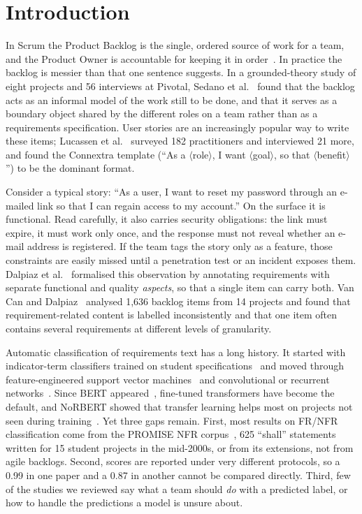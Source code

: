 \documentclass[conference,10pt,letterpaper]{IEEEtran}
\begin{document}
\section{Introduction}\label{sec:intro}
In Scrum the Product Backlog is the single, ordered source of work for a team, and the Product Owner is accountable for keeping it in order~\cite{scrumguide2020}. In practice the backlog is messier than that one sentence suggests. In a grounded-theory study of eight projects and 56 interviews at Pivotal, Sedano et al.~\cite{sedano2019} found that the backlog acts as an informal model of the work still to be done, and that it serves as a boundary object shared by the different roles on a team rather than as a requirements specification. User stories are an increasingly popular way to write these items; Lucassen et al.~\cite{lucassen2016use} surveyed 182 practitioners and interviewed 21 more, and found the Connextra template (“As a $\langle$role$\rangle$, I want $\langle$goal$\rangle$, so that $\langle$benefit$\rangle$”) to be the dominant format.

Consider a typical story: “As a user, I want to reset my password through an e-mailed link so that I can regain access to my account.” On the surface it is functional. Read carefully, it also carries security obligations: the link must expire, it must work only once, and the response must not reveal whether an e-mail address is registered. If the team tags the story only as a feature, those constraints are easily missed until a penetration test or an incident exposes them. Dalpiaz et al.~\cite{dalpiaz2019} formalised this observation by annotating requirements with separate functional and quality \emph{aspects}, so that a single item can carry both. Van Can and Dalpiaz~\cite{vancan2025} analysed 1,636 backlog items from 14 projects and found that requirement-related content is labelled inconsistently and that one item often contains several requirements at different levels of granularity.

Automatic classification of requirements text has a long history. It started with indicator-term classifiers trained on student specifications~\cite{clelandhuang2007} and moved through feature-engineered support vector machines~\cite{kurtanovic2017,diascanedo2020} and convolutional or recurrent networks~\cite{rahman2019,rahimi2021}. Since BERT appeared~\cite{devlin2019}, fine-tuned transformers have become the default, and NoRBERT showed that transfer learning helps most on projects not seen during training~\cite{hey2020norbert,hey2022corrected}. Yet three gaps remain. First, most results on FR/NFR classification come from the PROMISE NFR corpus~\cite{promisenfr2007}, 625 “shall” statements written for 15 student projects in the mid-2000s, or from its extensions, not from agile backlogs. Second, scores are reported under very different protocols, so a 0.99 in one paper and a 0.87 in another cannot be compared directly. Third, few of the studies we reviewed say what a team should \emph{do} with a predicted label, or how to handle the predictions a model is unsure about.
\end{document}
